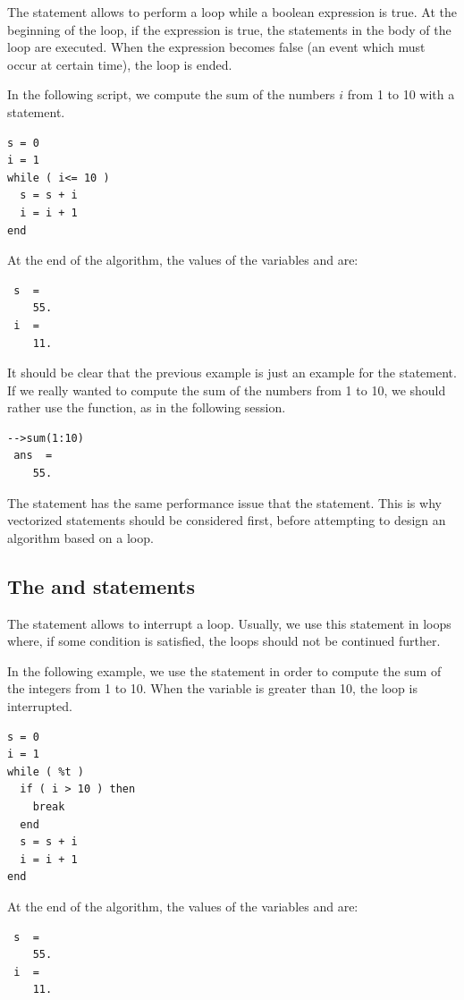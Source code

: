 The  statement allows to perform 
a loop while a boolean expression is true.
At the beginning of the loop, if the expression is true,
the statements in the body of the loop are executed.
When the expression becomes false (an event which 
must occur at certain time), the loop is ended.

In the following script, we compute the sum 
of the numbers $i$ from 1 to 10 with a 
statement.
\lstset{language=scilabscript}
\begin{lstlisting}
s = 0
i = 1
while ( i<= 10 )
  s = s + i
  i = i + 1
end
\end{lstlisting}
At the end of the algorithm, the values of the variables  
 and  are: 
\lstset{language=scilabscript}
\begin{lstlisting}
 s  =
    55.  
 i  =
    11.  
\end{lstlisting}

It should be clear that the previous example is 
just an example for the  statement.
If we really wanted to compute the sum of the numbers 
from 1 to 10, we should rather use the 
function, as in the following session.
\lstset{language=scilabscript}
\begin{lstlisting}
-->sum(1:10)
 ans  =
    55.  
\end{lstlisting}

The  statement has the same performance 
issue that the  statement. This is why 
vectorized statements should be considered first, before 
attempting to design an algorithm based on a  
loop.

\subsection{The  and  statements}

The  statement allows to interrupt 
a loop. Usually, we use this statement in loops where, 
if some condition is satisfied, the loops should not be continued
further.

In the following example, we use the  statement
in order to compute the sum of the integers from 1 to 10.
When the variable  is greater than 10, the loop is interrupted.
\lstset{language=scilabscript}
\begin{lstlisting}
s = 0
i = 1
while ( %t )
  if ( i > 10 ) then
    break
  end
  s = s + i
  i = i + 1
end
\end{lstlisting}
At the end of the algorithm, the values of the variables  
 and  are: 
\lstset{language=scilabscript}
\begin{lstlisting}
 s  =
    55.  
 i  =
    11.  
\end{lstlisting}

